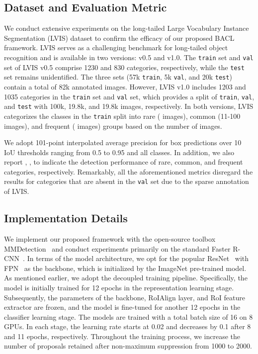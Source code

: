 \documentclass[lettersize,journal]{IEEEtran}
\begin{document}
\subsection{Dataset and Evaluation Metric}

We conduct extensive experiments on the long-tailed Large Vocabulary Instance Segmentation (LVIS) dataset to confirm the efficacy of our proposed BACL framework.
LVIS serves as a challenging benchmark for long-tailed object recognition and is available in two versions: v0.5 and v1.0.
The \texttt{train} set and \texttt{val} set of LVIS v0.5 comprise 1230 and 830 categories, respectively, while the \texttt{test} set remains unidentified.
The three sets (57k \texttt{train}, 5k \texttt{val}, and 20k \texttt{test}) contain a total of 82k annotated images.
However, LVIS v1.0 includes 1203 and 1035 categories in the \texttt{train} set and \texttt{val} set, which provides a split of \texttt{train}, \texttt{val}, and \texttt{test} with 100k, 19.8k, and 19.8k images, respectively.
In both versions, LVIS categorizes the classes in the \texttt{train} split into rare ( images), common (11-100 images), and frequent ( images) groups based on the number of images.

We adopt 101-point interpolated average precision for box predictions  over 10 IoU thresholds ranging from 0.5 to 0.95 and all classes.
In addition, we also report , ,  to indicate the detection performance of rare, common, and frequent categories, respectively.
Remarkably, all the aforementioned metrics disregard the results for categories that are absent in the \texttt{val} set due to the sparse annotation of LVIS.





\subsection{Implementation Details}

We implement our proposed framework with the open-source toolbox MMDetection~\cite{chen2019mmdetection} and conduct experiments primarily on the standard Faster R-CNN~\cite{ren2015faster}.
In terms of the model architecture, we opt for the popular ResNet~\cite{he2016deep} with FPN~\cite{lin2017feature} as the backbone, which is initialized by the ImageNet pre-trained model.
As mentioned earlier, we adopt the decoupled training pipeline.
Specifically, the model is initially trained for 12 epochs in the representation learning stage. Subsequently, the parameters of the backbone, RoIAlign layer, and RoI feature extractor are frozen, and the model is fine-tuned for another 12 epochs in the classifier learning stage.
The models are trained with a total batch size of 16 on 8 GPUs.
In each stage, the learning rate starts at 0.02 and decreases by 0.1 after 8 and 11 epochs, respectively.
Throughout the training process, we increase the number of proposals retained after non-maximum suppression from 1000 to 2000.
\end{document}
